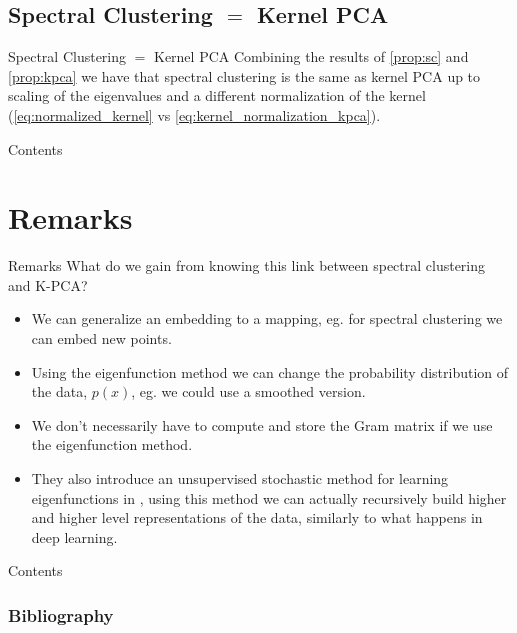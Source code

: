 \documentclass[aspectratio=169]{beamer}
\begin{document}
\subsection{Spectral Clustering \texorpdfstring{$=$}{TEXT} Kernel PCA}
\begin{frame}{Spectral Clustering \texorpdfstring{$=$}{TEXT} Kernel PCA}
  Combining the results of \cref{prop:sc} and \cref{prop:kpca} we have that spectral clustering is the same as kernel PCA up to scaling of the eigenvalues and a different normalization of the kernel (\cref{eq:normalized_kernel} vs \cref{eq:kernel_normalization_kpca}).
\end{frame}
\begin{frame}{Contents}
  \tableofcontents
\end{frame}

\section{Remarks}
\begin{frame}{Remarks}
  What do we gain from knowing this link between spectral clustering and K-PCA?
  \begin{itemize}
    \item We can generalize an embedding to a mapping, eg. for spectral clustering we can embed new points.
    \item Using the eigenfunction method we can change the probability distribution of the data, $p(x)$, eg. we could use a smoothed version.
    \item We don't necessarily have to compute and store the Gram matrix if we use the eigenfunction method.
    \item They also introduce an unsupervised stochastic method for learning eigenfunctions in \cite{bengio2003learning}, using this method we can actually recursively build higher and higher level representations of the data, similarly to what happens in deep learning.
  \end{itemize}
\end{frame}

\begin{frame}{Contents}
  \tableofcontents
\end{frame}
\begin{frame}
  \frametitle{Bibliography}
  \printbibliography
  \end{frame}
\end{document}
